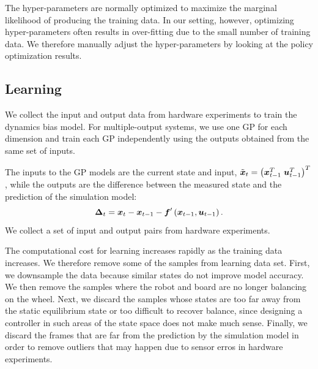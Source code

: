 

The hyper-parameters are normally optimized to maximize the marginal
likelihood of producing the training data.
In our setting, however, optimizing hyper-parameters often results in
over-fitting due to the small number of training data.
We therefore manually adjust the hyper-parameters by looking at the
policy optimization results.


\subsection{Learning} \label{sec:learning_learning}

We collect the input and output data from hardware experiments to train
the dynamics bias model.
For multiple-output systems, we use one GP for each dimension and train each GP
independently using the outputs obtained from the same set of inputs.

The inputs to the GP models are the current state and input,
$\tilde{\mbox{\boldmath \(x\)}}_t = \left(\mbox{\boldmath \(x\)}_{t-1}^T\;
\mbox{\boldmath \(u\)}_{t-1}^T\right)^T$, while the outputs are the difference
between the measured state and the prediction of the simulation model:
\begin{equation}
\mbox{\boldmath \(\Delta\)}_t = \mbox{\boldmath \(x\)}_t - \mbox{\boldmath \(x\)}_{t-1} - \mbox{\boldmath \(f\)}'\left(\mbox{\boldmath \(x\)}_{t-1},\mbox{\boldmath \(u\)}_{t-1}\right).
\end{equation}
We collect a set of input and output pairs from hardware experiments.

The computational cost for learning increases rapidly as the training
data increases.
We therefore remove some of the samples from learning data set.
First, we downsample the data because similar states do not improve
model accuracy.
We then remove the samples where the robot and board are no longer
balancing on the wheel.
Next, we discard the samples whose states are too far away from the static
equilibrium state or too difficult to recover balance, since designing a
controller in such areas of the state space does not make much sense. 
Finally, we discard the frames that are far from the prediction by the
simulation model in order to remove outliers that may happen due to
sensor erros in hardware experiments.

